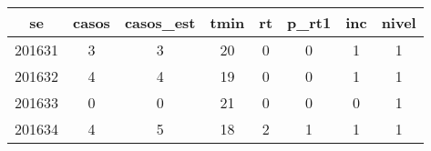 \begin{tabular}{c|ccccccc}
  \hline
se & casos & casos\_est & tmin & rt & p\_rt1 & inc & nivel \\ 
  \hline
201631 & 3 & 3 & 20 & 0 & 0 & 1 & 1 \\ 
  201632 & 4 & 4 & 19 & 0 & 0 & 1 & 1 \\ 
  201633 & 0 & 0 & 21 & 0 & 0 & 0 & 1 \\ 
  201634 & 4 & 5 & 18 & 2 & 1 & 1 & 1 \\ 
   \hline
\end{tabular}
